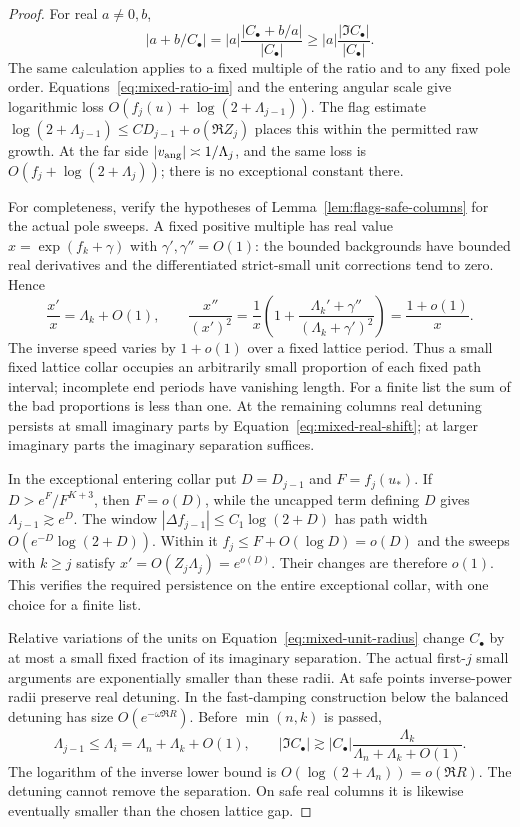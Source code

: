 \begin{proof}
For real $a\ne0,b$,
\[
 |a+b/C_\bullet|
 =|a|\frac{|C_\bullet+b/a|}{|C_\bullet|}
 \geq |a|\frac{|\Im C_\bullet|}{|C_\bullet|}.
\]
The same calculation applies to a fixed multiple of the ratio and
to any fixed pole order. Equations~\eqref{eq:mixed-ratio-im} and the
entering angular scale give logarithmic loss
$O(f_j(u)+\log(2+\Lambda_{j-1}))$. The flag estimate
$\log(2+\Lambda_{j-1})\leq C D_{j-1}+o(\Re Z_j)$ places this within
the permitted raw growth. At the far side $|v_{\rm ang}|\asymp
1/\Lambda_j$, and the same loss is $O(f_j+\log(2+\Lambda_j))$;
there is no exceptional constant there.

For completeness, verify the hypotheses of
Lemma~\ref{lem:flags-safe-columns} for the actual pole sweeps. A fixed
positive multiple has real value $x=\exp(f_k+\gamma)$ with
$\gamma',\gamma''=O(1)$: the bounded backgrounds have bounded real
derivatives and the differentiated strict-small unit corrections
tend to zero. Hence
\begin{equation}\label{eq:mixed-sweep}
 \frac{x'}x=\Lambda_k+O(1),\qquad
 \frac{x''}{(x')^2}
 =\frac1x\left(1+
  \frac{\Lambda_k'+\gamma''}{(\Lambda_k+\gamma')^2}\right)
 =\frac{1+o(1)}x.
\end{equation}
The inverse speed varies by $1+o(1)$ over a fixed lattice period.
Thus a small fixed lattice collar occupies an arbitrarily small
proportion of each fixed path interval; incomplete end periods have
vanishing length. For a finite list the sum of the bad proportions
is less than one. At the remaining columns real detuning persists
at small imaginary parts by Equation~\eqref{eq:mixed-real-shift};
at larger imaginary parts the imaginary separation suffices.

In the exceptional entering collar put $D=D_{j-1}$ and
$F=f_j(u_*)$. If $D>e^F/F^{K+3}$, then $F=o(D)$, while the uncapped
term defining $D$ gives $\Lambda_{j-1}\gtrsim e^D$. The window
$|\Delta f_{j-1}|\leq C_1\log(2+D)$ has path width
$O(e^{-D}\log(2+D))$. Within it $f_j\leq F+O(\log D)=o(D)$ and
the sweeps with $k\geq j$ satisfy
$x'=O(Z_j\Lambda_j)=e^{o(D)}$. Their changes are therefore $o(1)$.
This verifies the required persistence on the entire exceptional
collar, with one choice for a finite list.

Relative variations of the units on
Equation~\eqref{eq:mixed-unit-radius} change $C_\bullet$ by at most
a small fixed fraction of its imaginary separation. The actual
first-$j$ small arguments are exponentially smaller than these
radii. At safe points inverse-power radii preserve real detuning.
In the fast-damping construction below the balanced detuning has
size $O(e^{-\omega\Re R})$. Before $\min(n,k)$ is passed,
\[
 \Lambda_{j-1}\leq\Lambda_i
 =\Lambda_n+\Lambda_k+O(1),\qquad
 |\Im C_\bullet|\gtrsim
 |C_\bullet|\frac{\Lambda_k}{\Lambda_n+\Lambda_k+O(1)}.
\]
The logarithm of the inverse lower bound is
$O(\log(2+\Lambda_n))=o(\Re R)$. The detuning cannot remove the
separation. On safe real columns it is likewise eventually smaller
than the chosen lattice gap.


\end{proof}
